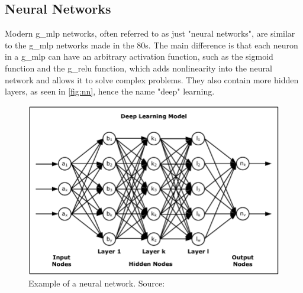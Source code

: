 \subsection{Neural Networks}
Modern \gls*{g_mlp} networks, often referred to as just "neural networks", are similar to the \gls*{g_mlp} networks made in the 80s. The main difference is that each neuron in a \gls*{g_mlp} can have an arbitrary activation function, such as the sigmoid function and the \gls*{g_relu}\cite{relu} function, which adds nonlinearity into the neural network and allows it to solve complex problems. They also contain more hidden layers, as seen in \autoref{fig:nn}, hence the name "deep" learning.
\begin{figure}[H]
    \centering
    \includegraphics[width=\linewidth]{resources/related_works/nn.png}
    \caption{Example of a neural network. Source: \cite{nn_image}}
    \label{fig:nn}
\end{figure}
